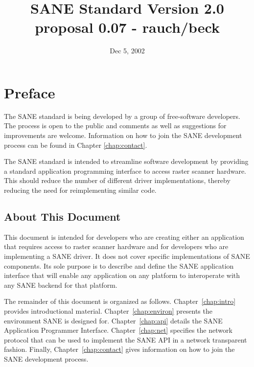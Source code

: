 \documentclass[11pt,DVIps]{report}
\title{\huge SANE Standard Version 2.0 proposal 0.07 - rauch/beck}
\author{}
\date{Dec 5, 2002}
\begin{document}
\newcommand{\filename}[1]{{\tt #1}}
\newcommand{\code}[1]{{\tt #1}}
\newcommand{\var}[1]{{\it #1}}
\newcommand{\defn}[1]{#1\index{#1}}

\begin{latexonly}
  \setcounter{changebargrey}{0}   %
\end{latexonly}

\maketitle
\tableofcontents
\listoffigures
\listoftables


\chapter{Preface}

The SANE standard is being developed by a group of free-software
developers.  The process is open to the public and comments as well as
suggestions for improvements are welcome.  Information on how to join
the SANE development process can be found in Chapter
\ref{chap:contact}.

The SANE standard is intended to streamline software development by
providing a standard application programming interface to access
raster scanner hardware.  This should reduce the number of different
driver implementations, thereby reducing the need for reimplementing
similar code.


\section{About This Document}

This document is intended for developers who are creating either an
application that requires access to raster scanner hardware and for
developers who are implementing a SANE driver.  It does not cover
specific implementations of SANE components.  Its sole purpose is to
describe and define the SANE application interface that will enable
any application on any platform to interoperate with any SANE backend
for that platform.

The remainder of this document is organized as follows.
Chapter~\ref{chap:intro} provides introductional material.
Chapter~\ref{chap:environ} presents the environment SANE is designed
for.  Chapter~\ref{chap:api} details the SANE Application Programmer
Interface.  Chapter~\ref{chap:net} specifies the network protocol that
can be used to implement the SANE API in a network transparent
fashion.  Finally, Chapter~\ref{chap:contact} gives information on how
to join the SANE development process.
\end{document}
